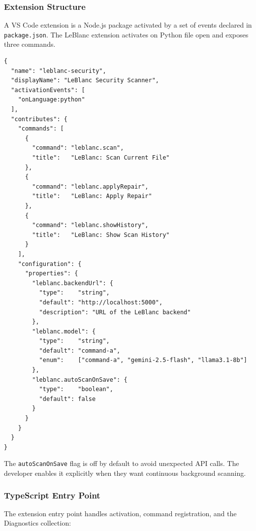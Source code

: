 \documentclass[12pt,a4paper]{report}
\begin{document}
\subsubsection{Extension Structure}

A VS Code extension is a Node.js package activated by a set of events declared
in \texttt{package.json}. The LeBlanc extension activates on Python file open
and exposes three commands.

\begin{lstlisting}[language={}, caption={Extension manifest (\texttt{package.json} excerpt)},
                   label={lst:pkgjson}]
{
  "name": "leblanc-security",
  "displayName": "LeBlanc Security Scanner",
  "activationEvents": [
    "onLanguage:python"
  ],
  "contributes": {
    "commands": [
      {
        "command": "leblanc.scan",
        "title":   "LeBlanc: Scan Current File"
      },
      {
        "command": "leblanc.applyRepair",
        "title":   "LeBlanc: Apply Repair"
      },
      {
        "command": "leblanc.showHistory",
        "title":   "LeBlanc: Show Scan History"
      }
    ],
    "configuration": {
      "properties": {
        "leblanc.backendUrl": {
          "type":    "string",
          "default": "http://localhost:5000",
          "description": "URL of the LeBlanc backend"
        },
        "leblanc.model": {
          "type":    "string",
          "default": "command-a",
          "enum":    ["command-a", "gemini-2.5-flash", "llama3.1-8b"]
        },
        "leblanc.autoScanOnSave": {
          "type":    "boolean",
          "default": false
        }
      }
    }
  }
}
\end{lstlisting}

The \texttt{autoScanOnSave} flag is off by default to avoid unexpected API calls.
The developer enables it explicitly when they want continuous background scanning.

\subsubsection{TypeScript Entry Point}

The extension entry point handles activation, command registration, and the
Diagnostics collection:
\end{document}
